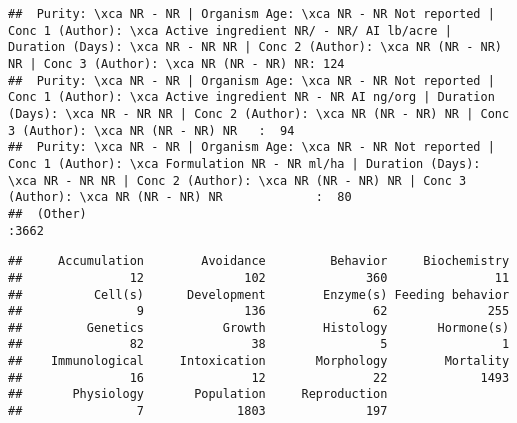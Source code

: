 \documentclass[]{article}
\newenvironment{Shaded}{\begin{snugshade}}{\end{snugshade}}
\newcommand{\KeywordTok}[1]{\textcolor[rgb]{0.13,0.29,0.53}{\textbf{#1}}}
\newcommand{\NormalTok}[1]{#1}
\newcommand{\OperatorTok}[1]{\textcolor[rgb]{0.81,0.36,0.00}{\textbf{#1}}}
\begin{document}
\begin{verbatim}
##  Purity: \xca NR - NR | Organism Age: \xca NR - NR Not reported | Conc 1 (Author): \xca Active ingredient NR/ - NR/ AI lb/acre | Duration (Days): \xca NR - NR NR | Conc 2 (Author): \xca NR (NR - NR) NR | Conc 3 (Author): \xca NR (NR - NR) NR: 124  
##  Purity: \xca NR - NR | Organism Age: \xca NR - NR Not reported | Conc 1 (Author): \xca Active ingredient NR - NR AI ng/org | Duration (Days): \xca NR - NR NR | Conc 2 (Author): \xca NR (NR - NR) NR | Conc 3 (Author): \xca NR (NR - NR) NR   :  94  
##  Purity: \xca NR - NR | Organism Age: \xca NR - NR Not reported | Conc 1 (Author): \xca Formulation NR - NR ml/ha | Duration (Days): \xca NR - NR NR | Conc 2 (Author): \xca NR (NR - NR) NR | Conc 3 (Author): \xca NR (NR - NR) NR             :  80  
##  (Other)                                                                                                                                                                                                                                         :3662
\end{verbatim}

\begin{Shaded}
\end{Shaded}

\begin{verbatim}
##     Accumulation        Avoidance         Behavior     Biochemistry 
##               12              102              360               11 
##          Cell(s)      Development        Enzyme(s) Feeding behavior 
##                9              136               62              255 
##         Genetics           Growth        Histology       Hormone(s) 
##               82               38                5                1 
##    Immunological     Intoxication       Morphology        Mortality 
##               16               12               22             1493 
##       Physiology       Population     Reproduction 
##                7             1803              197
\end{verbatim}

\begin{Shaded}
\end{Shaded}
\end{document}
